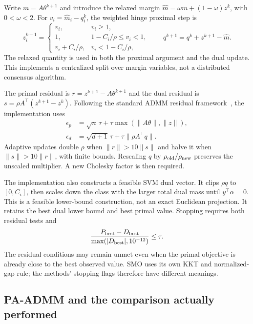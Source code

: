 \documentclass{article}
\begin{document}
Write $m=A\theta^{k+1}$ and introduce the relaxed margin
$\widehat m=\omega m+(1-\omega)z^k$, with $0<\omega<2$. For $v_i=\widehat m_i-q_i^k$, the weighted hinge proximal step is
\begin{equation}
 z_i^{k+1}=\begin{cases}
  v_i, & v_i\geq1,\\
  1, & 1-C_i/\rho\leq v_i<1,\\
  v_i+C_i/\rho, & v_i<1-C_i/\rho,
 \end{cases}
 \qquad q^{k+1}=q^k+z^{k+1}-\widehat m.
 \label{eq:prox}
\end{equation}
The relaxed quantity is used in both the proximal argument and the dual update. This implements a centralized split over margin variables, not a distributed consensus algorithm.

The primal residual is $r=z^{k+1}-A\theta^{k+1}$ and the dual residual is
$s=\rho A^\top(z^{k+1}-z^k)$. Following the standard ADMM residual framework~\citep{boyd2011}, the implementation uses
\begin{align}
 \epsilon_p&=\sqrt n\,\tau+\tau\max(\lVert A\theta\rVert,\lVert z\rVert),\\
 \epsilon_d&=\sqrt{d+1}\,\tau+\tau\lVert\rho A^\top q\rVert.
\end{align}
Adaptive updates double $\rho$ when $\lVert r\rVert>10\lVert s\rVert$ and halve it when $\lVert s\rVert>10\lVert r\rVert$, with finite bounds. Rescaling $q$ by $\rho_{\rm old}/\rho_{\rm new}$ preserves the unscaled multiplier. A new Cholesky factor is then required.

The implementation also constructs a feasible SVM dual vector. It clips $\rho q$ to $[0,C_i]$, then scales down the class with the larger total dual mass until $y^\top\alpha=0$. This is a feasible lower-bound construction, not an exact Euclidean projection. It retains the best dual lower bound and best primal value. Stopping requires both residual tests and
\begin{equation}
 \frac{P_{\rm best}-D_{\rm best}}{\max(|D_{\rm best}|,10^{-12})}\leq\tau.
 \label{eq:certificate}
\end{equation}
The residual conditions may remain unmet even when the primal objective is already close to the best observed value. SMO uses its own KKT and normalized-gap rule; the methods' stopping flags therefore have different meanings.

\subsection{PA-ADMM and the comparison actually performed}
\end{document}
